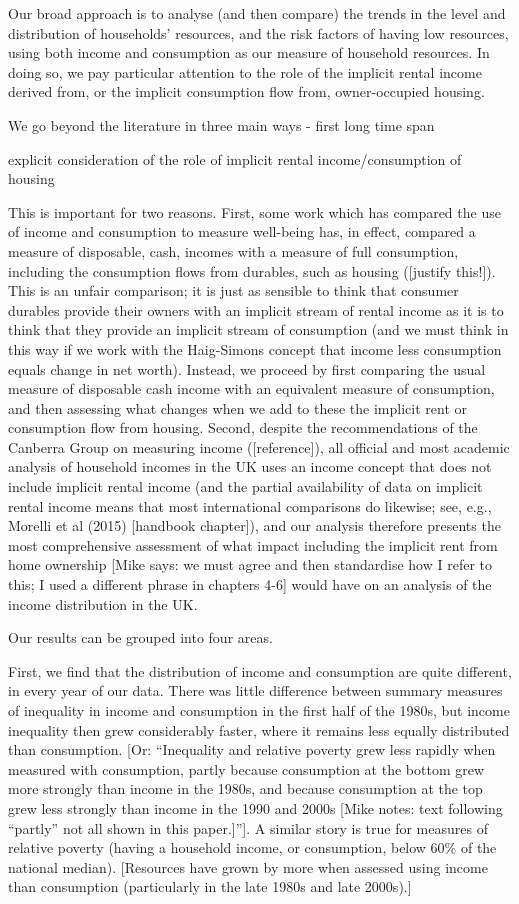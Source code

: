 Our broad approach is to analyse (and then compare) the trends in the level and distribution of households' resources, and the risk factors of having low resources, using both income and consumption as our measure of household resources. In doing so, we pay particular attention to the role of the implicit rental income derived from, or the implicit consumption flow from, owner-occupied housing.

We go beyond the literature in three main ways - first long time span

explicit consideration of the role of implicit rental income/consumption of housing 

This is important for two reasons. First, some work which has compared the use of income and consumption to measure well-being has, in effect, compared a measure of disposable, cash, incomes with a measure of full consumption, including the consumption flows from durables, such as housing ([justify this!]). This is an unfair comparison; it is just as sensible to think that consumer durables provide their owners with an implicit stream of rental income as it is to think that they provide an implicit stream of consumption (and we must think in this way if we work with the Haig-Simons concept that income less consumption equals change in net worth). Instead, we proceed by first comparing the usual measure of disposable cash income with an equivalent measure of consumption, and then assessing what changes when we add to these the implicit rent or consumption flow from housing.  Second, despite the recommendations of the Canberra Group on measuring income ([reference]), all official and most academic analysis of household incomes in the UK uses an income concept that does not include implicit rental income (and the partial availability of data on implicit rental income means that most international comparisons do likewise; see, e.g., Morelli et al (2015) [handbook chapter]), and our analysis therefore presents the most comprehensive assessment of what impact including the implicit rent from home ownership [Mike says: we must agree and then standardise how I refer to this; I used a different phrase in chapters 4-6] would have on an analysis of the income distribution in the UK.    

Our results can be grouped into four areas. 

First, we find that the distribution of income and consumption are quite different, in every year of our data. There was little difference between summary measures of inequality in income and consumption in the first half of the 1980s, but income inequality then grew considerably faster, where it remains less equally distributed than consumption. [Or: ``Inequality and relative poverty grew less rapidly when measured with consumption, partly because consumption at the bottom grew more strongly than income in the 1980s, and because consumption at the top grew less strongly than income in the 1990 and 2000s [Mike notes: text following "`partly"' not all shown in this paper.]'']. A similar story is true for measures of relative poverty (having a household income, or consumption, below 60\% of the national median). [Resources have grown by more when assessed using income than consumption (particularly in the late 1980s and late 2000s).]  

